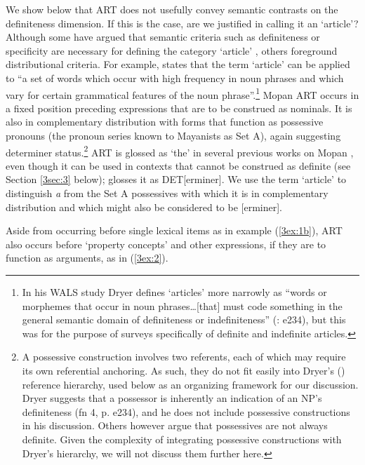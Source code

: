 \documentclass[output=paper]{langsci/langscibook}
\begin{document}
{
We show below that ART does not usefully convey semantic contrasts on the definiteness dimension. If this is the case, are we justified in calling it an `article'?  Although some have argued that semantic criteria such as definiteness or specificity are necessary for defining the category `article' \citep[e.\,g.,][833-4]{himmelmann:08}, others foreground distributional criteria.  For example, \cite[][158]{dryer:07} states that the term `article' can be applied to ``a set of words which occur with high frequency in noun phrases and which vary for certain grammatical features of the noun phrase''.\footnote{In his WALS study Dryer defines `articles' more narrowly as ``words or morphemes that occur in noun phrases…[that] must code something in the general semantic domain of definiteness or indefiniteness'' (\citeyear{dryer:14}: e234), but this was for the purpose of surveys specifically of definite and indefinite articles.} Mopan ART occurs in a fixed position preceding expressions that are to be construed as nominals. It is also in complementary distribution with forms that function as possessive pronouns (the pronoun series known to Mayanists as Set A), again suggesting determiner status.\footnote{A possessive construction involves two referents, each of which may require its own referential anchoring.  As such, they do not fit easily into Dryer's (\citeyear{dryer:14}) reference hierarchy, used below as an organizing framework for our discussion. Dryer suggests that a possessor is inherently an indication of an NP's definiteness (fn 4, p. e234), and he does not include possessive constructions in his discussion. Others however \citep[e.\,g.,][]{alexiadou:05} argue that possessives are not always definite. Given the complexity of integrating possessive constructions with Dryer's hierarchy, we will not discuss them further here.}  ART is glossed as `the' in several previous works on Mopan \citep{shaw:71,ulrich:ulrich:82,ulrich:ulrich:peck:86}, even though it can be used in contexts that cannot be construed as definite (see Section \ref{3sec:3} below); \cite{hofling:06} glosses it as DET[erminer]. We use the term `article' to distinguish {\emph{a}} from the Set A possessives with which it is in complementary distribution and which might also be considered to be {}[erminer].
}

Aside from occurring before single lexical items as in example (\ref{3ex:1b}), ART also occurs  before `property concepts' and other expressions, if they are to function as arguments, as in (\ref{3ex:2}).
\end{document}
